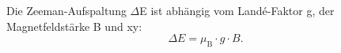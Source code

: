 


Die Zeeman-Aufspaltung $\Delta$E ist abhängig vom Landé-Faktor g, der Magnetfeldstärke B und xy:
\begin{equation}
    \Delta E = \mu_\text{B} \cdot g \cdot B.
\end{equation}



















